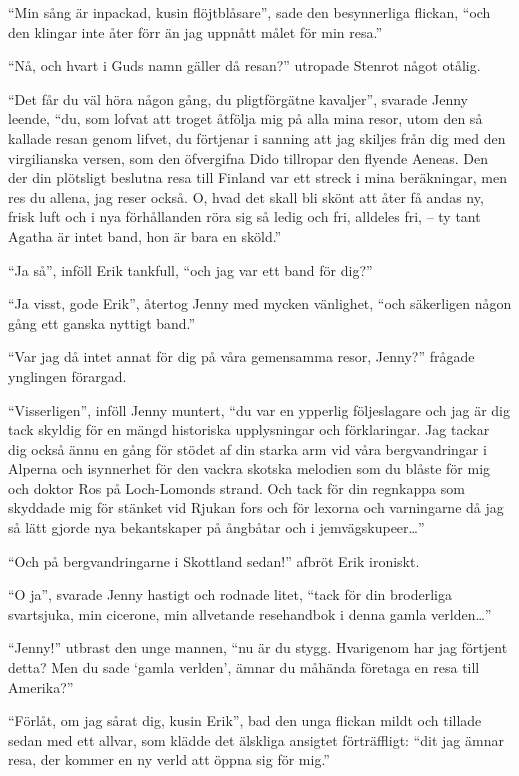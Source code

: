 ``Min sång är inpackad, kusin flöjtblåsare'', sade den besynnerliga
flickan, ``och den klingar inte åter förr än jag uppnått målet för min
resa.''

``Nå, och hvart i Guds namn gäller då resan?'' utropade Stenrot något
otålig.

``Det får du väl höra någon gång, du pligtförgätne kavaljer'', svarade
Jenny leende, ``du, som lofvat att troget åtfölja mig på alla mina
resor, utom den så kallade resan genom lifvet, du förtjenar i sanning
att jag skiljes från dig med den virgilianska versen, som den öfvergifna
Dido tillropar den flyende Aeneas. Den der din plötsligt beslutna resa
till Finland var ett streck i mina beräkningar, men res du allena, jag
reser också. O, hvad det skall bli skönt att åter få andas ny, frisk
luft och i nya förhållanden röra sig så ledig och fri, alldeles fri, --
ty tant Agatha är intet band, hon är bara en sköld.''

``Ja så'', inföll Erik tankfull, ``och jag var ett band för dig?''

``Ja visst, gode Erik'', återtog Jenny med mycken vänlighet, ``och
säkerligen någon gång ett ganska nyttigt band.''

``Var jag då intet annat för dig på våra gemensamma resor, Jenny?''
frågade ynglingen förargad.

``Visserligen'', inföll Jenny muntert, ``du var en ypperlig följeslagare
och jag är dig tack skyldig för en mängd historiska upplysningar och
förklaringar. Jag tackar dig också ännu en gång för stödet af din starka
arm vid våra bergvandringar i Alperna och isynnerhet för den vackra
skotska melodien som du blåste för mig och doktor Ros på Loch-Lomonds
strand. Och tack för din regnkappa som skyddade mig för stänket vid
Rjukan fors och för lexorna och varningarne då jag så lätt gjorde nya
bekantskaper på ångbåtar och i jemvägskupeer\ldots{}''

``Och på bergvandringarne i Skottland sedan!'' afbröt Erik ironiskt.

``O ja'', svarade Jenny hastigt och rodnade litet, ``tack för din
broderliga svartsjuka, min cicerone, min allvetande resehandbok i denna
gamla verlden\ldots{}''

``Jenny!'' utbrast den unge mannen, ``nu är du stygg. Hvarigenom har jag
förtjent detta? Men du sade `gamla verlden', ämnar du måhända företaga
en resa till Amerika?''

``Förlåt, om jag sårat dig, kusin Erik'', bad den unga flickan mildt och
tillade sedan med ett allvar, som klädde det älskliga ansigtet
förträffligt: ``dit jag ämnar resa, der kommer en ny verld att öppna sig
för mig.''

